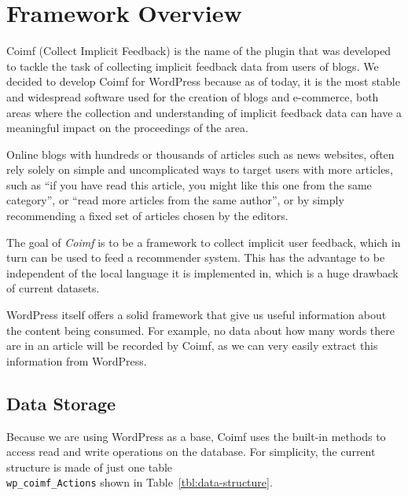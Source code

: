 \documentclass[sigconf,nonacm]{acmart}
\begin{document}
\section{Framework Overview}

Coimf (Collect Implicit Feedback) is the name of the plugin that was developed to
tackle the task of collecting implicit feedback data from users of blogs.
We decided to develop Coimf for WordPress because as of today, it is
the most stable and widespread software used for the creation of blogs and
e-commerce, both areas where the collection and understanding of implicit
feedback data can have a meaningful impact on the proceedings of the area.

Online blogs with hundreds or thousands of articles such as news websites, often
rely solely on simple and uncomplicated ways to target users with more articles,
such as ``if you have read this article, you might like this one from the same category'',
or ``read more articles from the same author'', or by simply recommending a fixed
set of articles chosen by the editors.

The goal of \textit{Coimf} is to be a framework to collect implicit user
feedback, which in turn can be used to feed a recommender system. This has the
advantage to be independent of the local language it is implemented in, which is
a huge drawback of current datasets.

WordPress itself offers a solid framework that give us useful information about
the content being consumed. For example, no data about how many words there are
in an article will be recorded by Coimf, as we can very easily extract this
information from WordPress.

\subsection{Data Storage}

Because we are using WordPress as a base, Coimf uses the built-in methods to
access read and write operations on the database. For simplicity, the current
structure is made of just one table \\ \texttt{wp\_coimf\_Actions} shown in Table~\ref{tbl:data-structure}.
\end{document}
